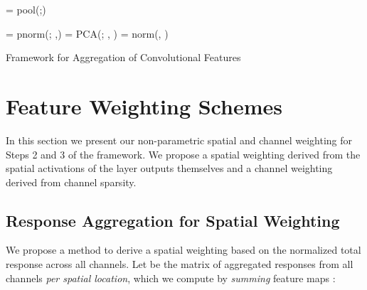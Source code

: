 \documentclass[runningheads]{llncs}
\begin{document}
\begin{algorithm}[t]

\DontPrintSemicolon
{}
\newcommand{\commentsty}[1]{{\color{green!50!black}#1}}



\BlankLine

{ = pool(;) }
{         }
{        }
{  
}

{ = pnorm(; ,) }
{ = PCA(; , ) }
{ = norm(, ) }
\caption{Framework for Aggregation of Convolutional Features}
\label{alg:general_features}
\end{algorithm}



 





 \section{Feature Weighting Schemes}
\label{sec:weighting}

\noindent
In this section we present our non-parametric spatial and channel weighting for Steps 2 and 3 of the framework. We propose a spatial weighting derived from the spatial activations of the layer outputs themselves and a channel weighting derived from channel sparsity.




\subsection{Response Aggregation for Spatial Weighting}
\label{subsec:spam}


We propose a method to derive a spatial weighting based on the normalized total response across all channels. Let  be the matrix of aggregated responses from all channels\textit{ per spatial location}, which we compute by \textit{summing} feature maps : 
\end{document}

